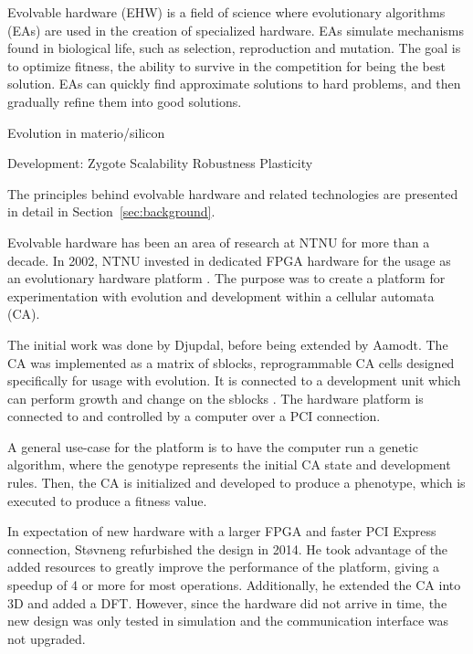 Evolvable hardware (EHW) is a field of science where evolutionary algorithms (EAs) are used in the creation of specialized hardware.
EAs simulate mechanisms found in biological life, such as selection, reproduction and mutation.
The goal is to optimize fitness, the ability to survive in the competition for being the best solution.
EAs can quickly find approximate solutions to hard problems, and then gradually refine them into good solutions.


Evolution in materio/silicon \cite{miller2014evolution}

Development:
\cite{harding2008artificial} \cite{tufte2008evodevo}
Zygote
Scalability
Robustness
Plasticity

The principles behind evolvable hardware and related technologies are presented in detail in Section~\ref{sec:background}.


Evolvable hardware has been an area of research at NTNU for more than a decade.
In 2002, NTNU invested in dedicated FPGA hardware for the usage as an evolutionary hardware platform .
The purpose was to create a platform for experimentation with evolution and development within a cellular automata (CA).

The initial work was done by Djupdal, before being extended by Aamodt.
The CA was implemented as a matrix of sblocks, reprogrammable CA cells designed specifically for usage with evolution.
It is connected to a development unit which can perform growth and change on the sblocks .
The hardware platform is connected to and controlled by a computer over a PCI connection.

A general use-case for the platform is to have the computer run a genetic algorithm, where the genotype represents the initial CA state and development rules.
Then, the CA is initialized and developed to produce a phenotype, which is executed to produce a fitness value.

In expectation of new hardware with a larger FPGA and faster PCI Express connection, Støvneng refurbished the design in 2014.
He took advantage of the added resources to greatly improve the performance of the platform, giving a speedup of 4 or more for most operations.
Additionally, he extended the CA into 3D and added a DFT.
However, since the hardware did not arrive in time, the new design was only tested in simulation and the communication interface was not upgraded.

